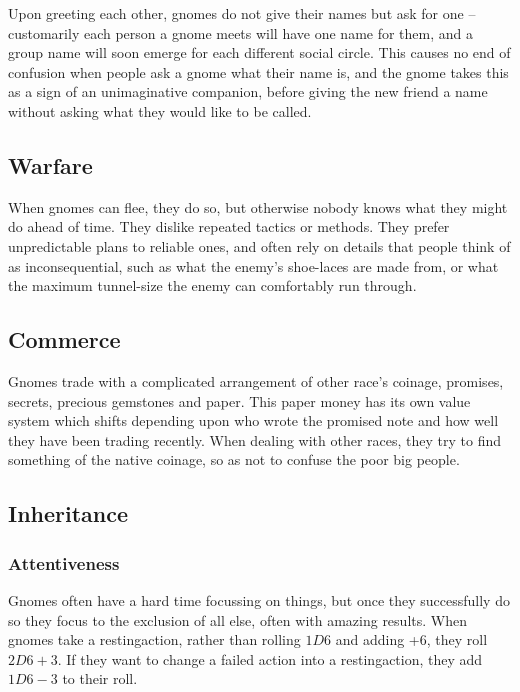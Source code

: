 \begin{multicols}{2}
Upon greeting each other, gnomes do not give their names but ask for one -- customarily each person a gnome meets will have one name for them, and a group name will soon emerge for each different social circle. This causes no end of confusion when people ask a gnome what their name is, and the gnome takes this as a sign of an unimaginative companion, before giving the new friend a name without asking what they would like to be called.

\subsection{Warfare}

When gnomes can flee, they do so, but otherwise nobody knows what they might do ahead of time.
They dislike repeated tactics or methods.
They prefer unpredictable plans to reliable ones, and often rely on details that people think of as inconsequential, such as what the enemy's shoe-laces are made from, or what the maximum tunnel-size the enemy can comfortably run through.

\subsection{Commerce}

Gnomes trade with a complicated arrangement of other race's coinage, promises, secrets, precious gemstones and paper. This paper money has its own value system which shifts depending upon who wrote the promised note and how well they have been trading recently. When dealing with other races, they try to find something of the native coinage, so as not to confuse the poor big people.

\subsection{Inheritance}

\subsubsection{Attentiveness}

Gnomes often have a hard time focussing on things, but once they successfully do so they focus to the exclusion of all else, often with amazing results.
When gnomes take a \gls{restingaction}, rather than rolling $1D6$ and adding +6, they roll $2D6+3$.
If they want to change a failed action into a \gls{restingaction}, they add $1D6-3$ to their roll.


\end{multicols}
